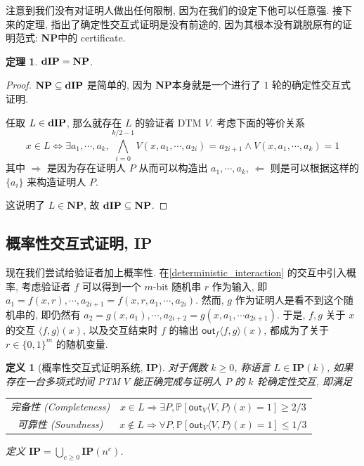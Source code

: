 \documentclass[8pt]{article}
\theoremstyle{compact}
\newtheorem{theorem}{定理}[section]
\newtheorem{definition}{定义}[section]
\def\le{\leqslant}
\def\ge{\geqslant}
\def\NP{\textbf{NP}}
\begin{document}
注意到我们没有对证明人做出任何限制, 因为在我们的设定下他可以任意强. 接下来的定理, 指出了确定性交互式证明是没有前途的, 因为其根本没有跳脱原有的证明范式: \NP 中的 certificate.

\begin{theorem}
	$\dIP = \NP$.
\end{theorem}
\begin{proof}
	$\NP \subseteq \dIP$ 是简单的, 因为 \NP 本身就是一个进行了 $1$ 轮的确定性交互式证明.

	任取 $L \in \textbf{dIP}$, 那么就存在 $L$ 的验证者 DTM $V$. 考虑下面的等价关系 $$x \in L \Leftrightarrow \exists a_1, \cdots, a_k, \bigwedge_{i=0}^{k/2-1}V(x, a_1, \cdots, a_{2i}) = a_{2i+1} \wedge V(x, a_1, \cdots, a_k) = 1$$ 其中 $\Rightarrow$ 是因为存在证明人 $P$ 从而可以构造出 $a_1, \cdots, a_k$, $\Leftarrow$ 则是可以根据这样的 $\{a_i\}$ 来构造证明人 $P$.

	这说明了 $L \in \NP$, 故 $\dIP \subseteq \NP$.
\end{proof}

\def\IP{\textbf{IP}}
\subsection{概率性交互式证明, \IP}
现在我们尝试给验证者加上概率性. 在\cref{deterministic_interaction} 的交互中引入概率, 考虑验证者 $f$ 可以得到一个 $m$-bit 随机串 $r$ 作为输入, 即 $a_1 = f(x, r), \cdots, a_{2i+1} = f(x, r, a_1, \cdots, a_{2i})$. 然而, $g$ 作为证明人是看不到这个随机串的, 即仍然有 $a_2 = g(x, a_1), \cdots, a_{2i+2} = g(x, a_1, \cdots a_{2i+1})$. 于是, $f, g$ 关于 $x$ 的交互 $\langle f, g \rangle(x)$, 以及交互结束时 $f$ 的输出 $\textsf{out}_f\langle f, g \rangle (x)$, 都成为了关于 $r \in \{0, 1\}^m$ 的随机变量.

\begin{definition}[概率性交互式证明系统, \IP]
	对于偶数 $k \ge 0$, 称语言 $L \in \IP(k)$, 如果存在一台多项式时间 PTM $V$ 能正确完成与证明人 $P$ 的 $k$ 轮确定性交互, 即满足 \begin{center}
		\begin{tabular}{cc}
			完备性 (Completeness) & $x \in L \Rightarrow \exists P, \mathbb P[\textsf{out}_V\langle V, P\rangle(x) = 1] \ge 2/3$ \\
			可靠性 (Soundness) & $x \notin L \Rightarrow \forall P, \mathbb P[\textsf{out}_V\langle V, P\rangle(x) = 1] \le 1/3$ \\
		\end{tabular}
	\end{center}

	定义 $\IP = \bigcup_{c \ge 0}\IP(n^c)$.
\end{definition}
\end{document}
